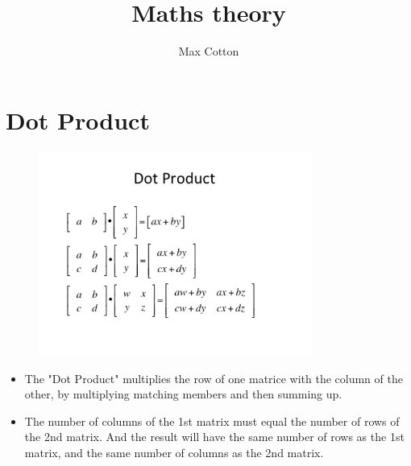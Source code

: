 \documentclass[10pt,a4paper]{article}
\title{Maths theory}
\author{Max Cotton}
\date{}
\begin{document}
\maketitle

\section{Dot Product}

\begin{figure}[h!]
\centering
\includegraphics[width=0.8\textwidth]{src/images/dot-product.png}
\end{figure}

\begin{itemize}
    \item The "Dot Product" multiplies the row of one matrice with the column of the other, by multiplying matching members and then summing up. 
    \item The number of columns of the 1st matrix must equal the number of rows of the 2nd matrix. And the result will have the same number of rows as the 1st matrix, and the same number of columns as the 2nd matrix.
\end{itemize}
\end{document}
